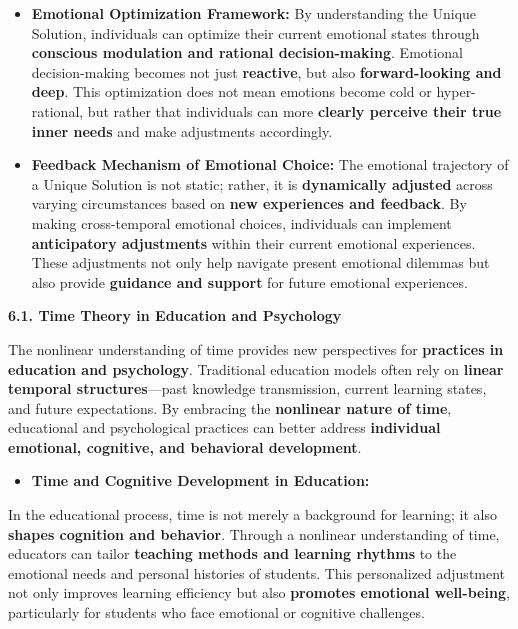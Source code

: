 \documentclass[
]{article}
\begin{document}
\begin{itemize}
\item
  \textbf{Emotional Optimization Framework:} By understanding the Unique
  Solution, individuals can optimize their current emotional states
  through \textbf{conscious modulation and rational decision-making}.
  Emotional decision-making becomes not just \textbf{reactive}, but also
  \textbf{forward-looking and deep}. This optimization does not mean
  emotions become cold or hyper-rational, but rather that individuals
  can more \textbf{clearly perceive their true inner needs} and make
  adjustments accordingly.
\item
  \textbf{Feedback Mechanism of Emotional Choice:} The emotional
  trajectory of a Unique Solution is not static; rather, it is
  \textbf{dynamically adjusted} across varying circumstances based on
  \textbf{new experiences and feedback}. By making cross-temporal
  emotional choices, individuals can implement \textbf{anticipatory
  adjustments} within their current emotional experiences. These
  adjustments not only help navigate present emotional dilemmas but also
  provide \textbf{guidance and support} for future emotional
  experiences.
\end{itemize}

\textbf{6.1. Time Theory in Education and Psychology}

The nonlinear understanding of time provides new perspectives for
\textbf{practices in education and psychology}. Traditional education
models often rely on \textbf{linear temporal structures}---past
knowledge transmission, current learning states, and future
expectations. By embracing the \textbf{nonlinear nature of time},
educational and psychological practices can better address
\textbf{individual emotional, cognitive, and behavioral development}.

\begin{itemize}
\item
  \textbf{Time and Cognitive Development in Education:}
\end{itemize}

In the educational process, time is not merely a background for
learning; it also \textbf{shapes cognition and behavior}. Through a
nonlinear understanding of time, educators can tailor \textbf{teaching
methods and learning rhythms} to the emotional needs and personal
histories of students. This personalized adjustment not only improves
learning efficiency but also \textbf{promotes emotional well-being},
particularly for students who face emotional or cognitive challenges.
\end{document}

